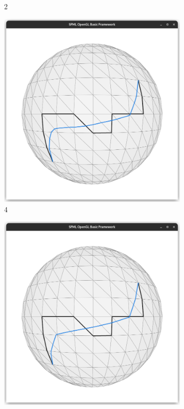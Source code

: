 \documentclass{stdlocal}
\begin{document}
\begin{figure}
\begin{subfigure}[b]{0.24\linewidth}
    \caption{2}
  \end{subfigure}
  \begin{subfigure}[b]{0.24\linewidth}
    \centering
    \includegraphics[width=\linewidth,trim={25px 20 25 50},clip]{images/sphere-geodesic-1-iteration-4.png}
    \caption{4}
  \end{subfigure}
  \begin{subfigure}[b]{0.24\linewidth}
    \centering
    \includegraphics[width=\linewidth,trim={25px 20 25 50},clip]{images/sphere-geodesic-1-iteration-8.png}

\end{subfigure}
\end{figure}
\end{document}
